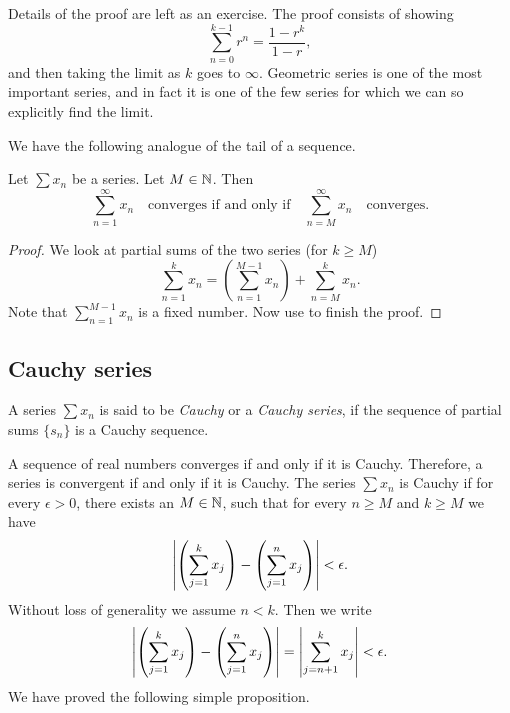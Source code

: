 Details of the proof are left as an exercise.
The proof consists of showing 
\begin{equation*}
\sum_{n=0}^{k-1} r^n = \frac{1-r^k}{1-r} ,
\end{equation*}
and then taking the limit as $k$ goes to $\infty$.
Geometric series is one of the most important series, and in fact it is
one of the few series for which we can so explicitly find the limit.

\medskip

We have the following analogue of the tail of a sequence.

\begin{prop}
Let $\sum x_n$ be a series.  Let $M \in {\mathbb{N}}$.  Then
\begin{equation*}
\sum_{n=1}^\infty x_n \quad \text{converges if and only if} \quad
\sum_{n=M}^\infty x_n \quad \text{converges.}
\end{equation*}
\end{prop}

\begin{proof}
We look at partial sums of the two series (for $k \geq M$)
\begin{equation*}
\sum_{n=1}^{k} x_n
=
\left(
\sum_{n=1}^{M-1} x_n
\right)
+
\sum_{n=M}^{k} x_n .
\end{equation*}
Note that 
$\sum_{n=1}^{M-1} x_n$ is a fixed number.  Now use
 to finish the proof.
\end{proof}

\subsection{Cauchy series}

\begin{defn}
A series $\sum x_n$ is said to be \emph{Cauchy} or a
\emph{Cauchy series},
if the sequence of partial sums $\{ s_n \}$ is a Cauchy sequence.
\end{defn}

A sequence of real numbers converges if and only if it is
Cauchy.  Therefore, a series is convergent if and only if it is Cauchy.
The series $\sum x_n$ is Cauchy if for every $\epsilon > 0$,
there exists an $M \in {\mathbb{N}}$, such that for every $n \geq M$
and $k \geq M$ we have
\begin{equation*}
\left\lvert { \left( \sum_{j=1}^k x_j \right) - \left( \sum_{j=1}^n x_j \right) } \right\rvert
< \epsilon .
\end{equation*}
Without loss of generality we assume $n < k$.  Then we write
\begin{equation*}
\left\lvert { \left( \sum_{j=1}^k x_j \right) - \left( \sum_{j=1}^n x_j \right) } \right\rvert
=
\left\lvert { \sum_{j={n+1}}^k x_j } \right\rvert
< \epsilon .
\end{equation*}
We have proved the following simple proposition.

